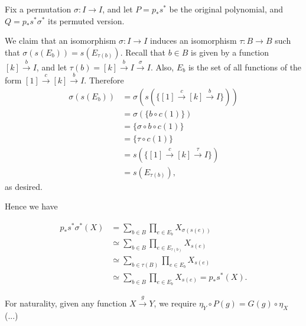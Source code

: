 \begin{solution}



Fix a permutation $\sigma:I\to I$, and let $P=p_*s^*$ be the original polynomial, and $Q=p_*s^*\sigma^*$ its permuted version.


We claim that an isomorphism $\sigma:I\to I$ induces an isomorphism $\tau:B\to B$ such that $\sigma(s(E_b))=s(E_{\tau(b)})$. Recall that $b\in B$ is given by a function $[k]\overset{b}{\to} I$, and let $\tau(b)=[k]\overset{b}{\to} I\overset{\sigma}{\to} I$. Also, $E_b$ is the set of all functions of the form $[1]\overset{c}{\to}[k]\overset{b}{\to}I$. Therefore
\begin{align*}
	\sigma(s(E_b)) &= \sigma(s(\{[1]\overset{c}{\to}[k]\overset{b}{\to} I\}))\\
    	&= \sigma(\{b\circ c(1)\})\\
        &= \{\sigma\circ b\circ c(1)\}\\
		&= \{\tau\circ c(1)\}\\
        &= s(\{[1]\overset{c}{\to}[k]\overset{\tau}{\to} I\})\\
        &= s(E_{\tau(b)}),
\end{align*}
as desired.

Hence we have

\begin{align*}
p_*s^*\sigma^*(X) &= \sum_{b\in B}\prod_{e\in E_b} X_{\sigma(s(e))}\\
    &\simeq \sum_{b\in B}\prod_{e\in E_{\tau(b)}} X_{s(e)}\\
    &\simeq \sum_{b\in \tau(B)}\prod_{e\in E_b} X_{s(e)}\\
    &\simeq \sum_{b\in B}\prod_{e\in E_b} X_{s(e)} = p_*s^*(X).
\end{align*}

For naturality, given any function $X\overset{g}{\to} Y$, we require $\eta_Y\circ P(g) = G(g)\circ \eta_X$ (...)
\end{solution}


